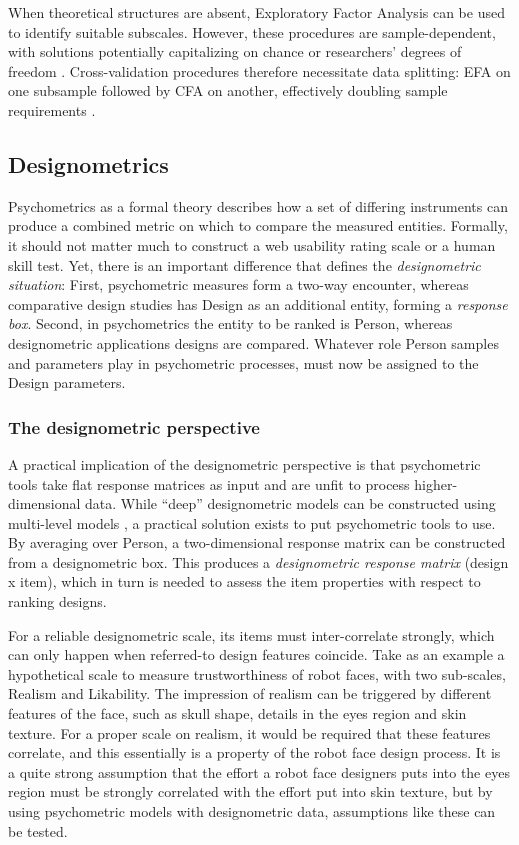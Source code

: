 \documentclass[
  authoryear,
  review]{elsarticle}
\begin{document}
When theoretical structures are absent, Exploratory Factor Analysis can
be used to identify suitable subscales. However, these procedures are
sample-dependent, with solutions potentially capitalizing on chance or
researchers' degrees of freedom \citep{Simmons2011}. Cross-validation
procedures therefore necessitate data splitting: EFA on one subsample
followed by CFA on another, effectively doubling sample requirements
\citep{Anderson1988}.

\subsection{Designometrics}\label{designometrics}

Psychometrics as a formal theory describes how a set of differing
instruments can produce a combined metric on which to compare the
measured entities. Formally, it should not matter much to construct a
web usability rating scale or a human skill test. Yet, there is an
important difference that defines the \emph{designometric situation}:
First, psychometric measures form a two-way encounter, whereas
comparative design studies has Design as an additional entity, forming a
\emph{response box}. Second, in psychometrics the entity to be ranked is
Person, whereas designometric applications designs are compared.
Whatever role Person samples and parameters play in psychometric
processes, must now be assigned to the Design parameters.

\subsubsection{The designometric
perspective}\label{the-designometric-perspective}

A practical implication of the designometric perspective is that
psychometric tools take flat response matrices as input and are unfit to
process higher-dimensional data. While ``deep'' designometric models can
be constructed using multi-level models \citep[307-323]{Schmettow2021},
a practical solution exists to put psychometric tools to use. By
averaging over Person, a two-dimensional response matrix can be
constructed from a designometric box. This produces a
\emph{designometric response matrix} (design x item), which in turn is
needed to assess the item properties with respect to ranking designs.

For a reliable designometric scale, its items must inter-correlate
strongly, which can only happen when referred-to design features
coincide. Take as an example a hypothetical scale to measure
trustworthiness of robot faces, with two sub-scales, Realism and
Likability. The impression of realism can be triggered by different
features of the face, such as skull shape, details in the eyes region
and skin texture. For a proper scale on realism, it would be required
that these features correlate, and this essentially is a property of the
robot face design process. It is a quite strong assumption that the
effort a robot face designers puts into the eyes region must be strongly
correlated with the effort put into skin texture, but by using
psychometric models with designometric data, assumptions like these can
be tested.
\end{document}
